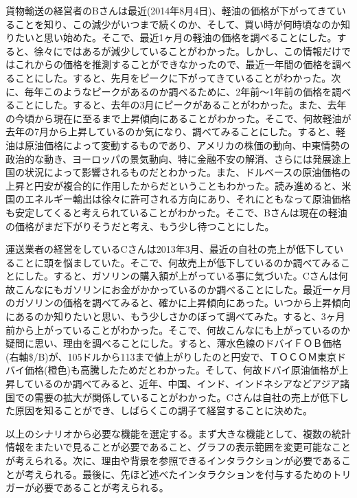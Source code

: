 \documentclass{matsushita-zemi}
\begin{document}
\begin{screen}
貨物輸送の経営者のBさんは最近(2014年8月4日)、軽油の価格が下がってきていることを知り、この減少がいつまで続くのか、そして、買い時が何時頃なのか知りたいと思い始めた。そこで、最近1ヶ月の軽油の価格を調べることにした。すると、徐々にではあるが減少していることがわかった。しかし、この情報だけではこれからの価格を推測することができなかったので、最近一年間の価格を調べることにした。すると、先月をピークに下がってきていることがわかった。次に、毎年このようなピークがあるのか調べるために、2年前〜1年前の価格を調べることにした。すると、去年の3月にピークがあることがわかった。また、去年の今頃から現在に至るまで上昇傾向にあることがわかった。そこで、何故軽油が去年の7月から上昇しているのか気になり、調べてみることにした。すると、軽油は原油価格によって変動するものであり、アメリカの株価の動向、中東情勢の政治的な動き、ヨーロッパの景気動向、特に金融不安の解消、さらには発展途上国の状況によって影響されるものだとわかった。また、ドルベースの原油価格の上昇と円安が複合的に作用したからだということもわかった。読み進めると、米国のエネルギー輸出は徐々に許可される方向にあり、それにともなって原油価格も安定してくると考えられていることがわかった。そこで、Bさんは現在の軽油の価格がまだ下がりそうだと考え、もう少し待つことにした。
\end{screen}
\begin{screen}
運送業者の経営をしているCさんは2013年3月、最近の自社の売上が低下していることに頭を悩ましていた。そこで、何故売上が低下しているのか調べてみることにした。すると、ガソリンの購入額が上がっている事に気づいた。Cさんは何故こんなにもガソリンにお金がかかっているのか調べることにした。最近一ヶ月のガソリンの価格を調べてみると、確かに上昇傾向にあった。いつから上昇傾向にあるのか知りたいと思い、もう少しさかのぼって調べてみた。すると、3ヶ月前から上がっていることがわかった。そこで、何故こんなにも上がっているのか疑問に思い、理由を調べることにした。すると、薄水色線のドバイＦＯＢ価格(右軸\$/B)が、105ドルから113まで値上がりしたのと円安で、ＴＯＣＯＭ東京ドバイ価格(橙色)も高騰したためだとわかった。そして、何故ドバイ原油価格が上昇しているのか調べてみると、近年、中国、インド、インドネシアなどアジア諸国での需要の拡大が関係していることがわかった。Cさんは自社の売上が低下した原因を知ることができ、しばらくこの調子て経営することに決めた。
\end{screen}
以上のシナリオから必要な機能を選定する。まず大きな機能として、複数の統計情報をまたいで見ることが必要であること、グラフの表示範囲を変更可能なことが考えられる。次に、理由や背景を参照できるインタラクションが必要であることが考えられる。最後に、先ほど述べたインタラクションを付与するためのトリガーが必要であることが考えられる。
\end{document}
